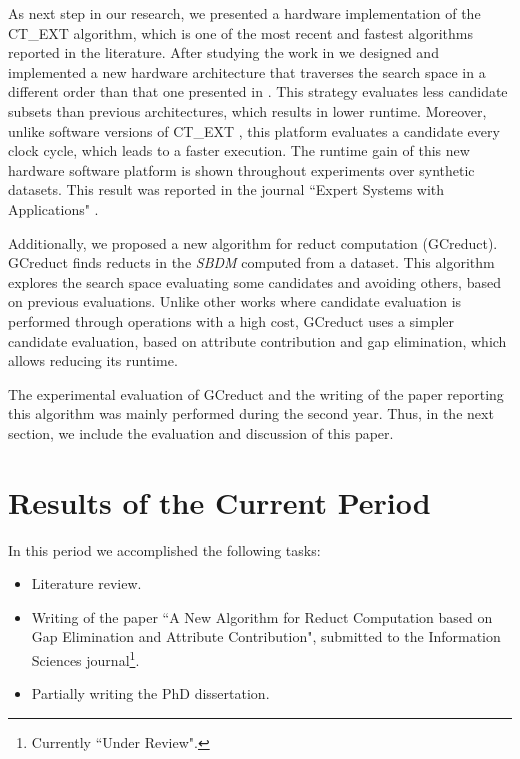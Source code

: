 \documentclass[authoryear,11pt]{elsarticle}
\begin{document}
  As next step in our research, we presented a hardware implementation of the CT\_EXT algorithm, which is one of the most recent and fastest algorithms reported in the literature. After studying the work in \citep{Rojas12} we designed and implemented a new hardware architecture that traverses the search space in a different order than that one presented in \citep{Rojas07, Rojas12,Rodriguez14}. This strategy evaluates less	candidate subsets than previous architectures, which results in lower runtime. Moreover, unlike software versions of CT\_EXT \citep{Sanchez07, Sanchez10}, this platform evaluates a candidate every clock cycle, which leads to a faster execution. The runtime gain of this new hardware software platform is shown throughout experiments over synthetic datasets. This result was reported in the journal ``Expert Systems with Applications"  \citep{Rodriguez15}.
  
  Additionally, we proposed a new algorithm for reduct computation (GCreduct). GCreduct finds reducts in the \textit{SBDM} computed from a dataset. This algorithm explores the search space evaluating some candidates and avoiding others, based on previous evaluations. Unlike other works \citep{WangP07,Lias13} where candidate evaluation is performed through operations with a high cost, GCreduct uses a simpler candidate evaluation, based on attribute contribution and gap elimination, which allows reducing its runtime. 
  
  The experimental evaluation of GCreduct and the writing of the paper reporting this algorithm was mainly performed during the second year. Thus, in the next section, we include the evaluation and discussion of this paper.


\section{Results of the Current Period}\label{current_results}
  In this period we accomplished the following tasks:
  \begin{itemize}
  	\itemsep0em 
  	\item Literature review.
  	\item Writing of the paper ``A New Algorithm for Reduct Computation based on Gap Elimination and Attribute Contribution", submitted to the Information Sciences journal\footnote{Currently ``Under Review".}.
  	\item Partially writing the PhD dissertation.
  \end{itemize}
  
\end{document}
